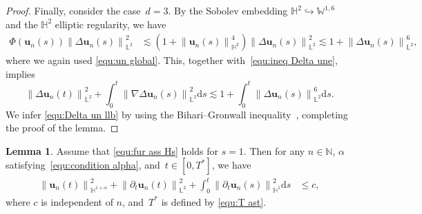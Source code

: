 \documentclass[11pt,reqno]{amsart}
\theoremstyle{definition}
\newtheorem{lemma}[theorem]{Lemma}
\numberwithin{equation}{section}
\newcommand{\bff}{\boldsymbol}
\newcommand{\bb}{\mathbb}
\newcommand{\ds}{\mathrm{d}s}
\newcommand{\pa}{\partial}
\newcommand{\norm}[2]{\left\|{#1}\right\|_{#2}}
\begin{document}
\begin{proof}
	Finally, consider the case~$d=3$. By the Sobolev embedding $\bb{H}^2\hookrightarrow \bb{W}^{1,6}$ and the $\bb{H}^2$ elliptic regularity, we have
	\begin{align*} 
		\Phi(\bff{u}_n(s))
		\norm{\Delta\bff{u}_n(s)}{\bb{L}^2}^2
		&\lesssim
		\left(1+ \norm{\bff{u}_n(s)}{\bb{H}^2}^4\right)
		\norm{\Delta \bff{u}_n(s)}{\bb{L}^2}^2
		\lesssim
		1 + \norm{\Delta\bff{u}_n(s)}{\bb{L}^2}^6,
	\end{align*}
	where we again used \eqref{equ:un global}. 
This, together with~\eqref{equ:ineq Delta une}, implies
\[
\norm{\Delta\bff{u}_n(t)}{\bb{L}^2}^2
+
\int_0^t
\norm{\nabla\Delta\bff{u}_n(s)}{\bb{L}^2}^2\ds
\lesssim
1 +
\int_{0}^{t} \norm{\Delta\bff{u}_n(s)}{\bb{L}^2}^6 \ds.
\]
We infer \eqref{equ:Delta un llb} by using the Bihari--Gronwall
inequality~\citep{Bih56}, completing the proof of the lemma.
\end{proof}



\begin{lemma}\label{lem:H2 dtu un}
	Assume that \eqref{equ:fur ass Hs} holds for $s=1$.
	Then for any $n\in \bb{N}$, $\alpha$ satisfying~\eqref{equ:condition alpha}, and~$t\in[0,T^\ast]$, we have
	\begin{align}\label{equ:un H1a llb}
		\norm{\bff{u}_n(t)}{\bb{H}^{1+\alpha}}^2
		+
		\norm{\pa_t \bff{u}_n(t)}{\bb{L}^2}^2
		+
		\int_0^t \norm{\pa_t \bff{u}_n(s)}{\bb{H}^1}^2 \ds 
		&\leq c,
	\end{align}
	where $c$ is independent of $n$, and~$T^\ast$ is defined by \eqref{equ:T ast}.
\end{lemma}
\end{document}
